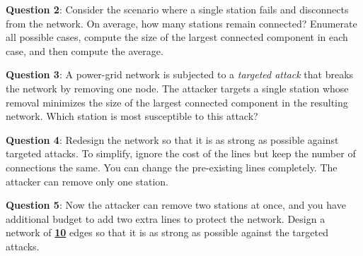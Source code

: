 \documentclass[a4paper, 17pt]{extarticle}
\begin{document}
{\bf Question 2}:
Consider the scenario where a single station fails and disconnects from the network. On average, how many stations remain connected? Enumerate all possible cases, compute the size of the largest connected component in each case, and then compute the average.

\clearpage

{\bf Question 3}:
A power-grid network is subjected to a \textit{targeted attack} that breaks the network by removing one node. The attacker targets a single station whose removal minimizes the size of the largest connected component in the resulting network.
Which station is most susceptible to this attack?

{\bf Question 4}:
Redesign the network so that it is as strong as possible against targeted attacks.
To simplify, ignore the cost of the lines but keep the number of connections the same. You can change the pre-existing lines completely. The attacker can remove only one station.

\clearpage

{\bf Question 5}:
Now the attacker can remove two stations at once, and you have additional budget to add two extra lines to protect the network.
Design a network of \underline{\textbf{10}} edges so that it is as strong as possible against the targeted attacks.
\end{document}
